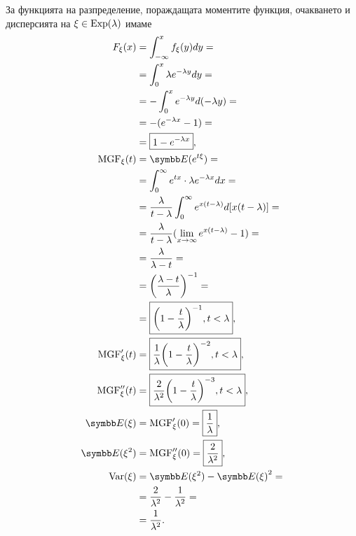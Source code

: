 \documentclass[
  headings=standardclasses,
  bibliography=totocnumbered,
]{scrartcl}
\begin{document}
За функцията на разпределение, пораждащата моментите функция, очакването и дисперсията на \( \xi \in \operatorname{Exp}(\lambda) \) имаме
\begingroup
\allowdisplaybreaks
\begin{align*}
  F_\xi(x)
  &=
  \int_{-\infty}^x f_\xi(y) dy
  = \\ &=
  \int_0^x \lambda e^{-\lambda y} dy
  = \\ &=
  -\int_0^x e^{-\lambda y} d(-\lambda y)
  = \\ &=
  -(e^{-\lambda x} - 1)
  = \\ &=
  \boxed{1 - e^{-\lambda x}},
  \\
  \MGF_\xi(t)
  &=
  \Expect(e^{t\xi})
  = \\ &=
  \int_0^\infty e^{tx} \cdot \lambda e^{-\lambda x} dx
  = \\ &=
  \frac \lambda {t-\lambda} \int_0^\infty e^{x(t-\lambda)} d[x(t-\lambda)]
  = \\ &=
  \frac \lambda {t-\lambda} (\lim_{x \to \infty} e^{x(t-\lambda)} - 1)
  = \\ &=
  \frac \lambda {\lambda-t}
  = \\ &=
  {\left(\frac {\lambda-t} \lambda \right)}^{-1}
  = \\ &=
  \boxed{{\left(1 - \frac t \lambda \right)}^{-1}, t < \lambda},
  \\
  \MGF'_\xi(t)
  &=
  \boxed{\frac 1 \lambda {\left(1 - \frac t \lambda \right)}^{-2}, t < \lambda},
  \\
  \MGF''_\xi(t)
  &=
  \boxed{\frac 2 {\lambda^2} {\left(1 - \frac t \lambda \right)}^{-3}, t < \lambda},
  \\
  \Expect(\xi)
  &=
  \MGF'_\xi(0)
  =
  \boxed{\frac 1 \lambda},
  \\
  \Expect(\xi^2)
  &=
  \MGF''_\xi(0)
  =
  \boxed{\frac 2 {\lambda^2}},
  \\
  \Var(\xi)
  &=
  \Expect(\xi^2) - {\Expect(\xi)}^2
  = \\ &=
  \frac 2 {\lambda^2} - \frac 1 {\lambda^2}
  = \\ &=
  \frac 1 {\lambda^2}.
\end{align*}
\endgroup
\end{document}
